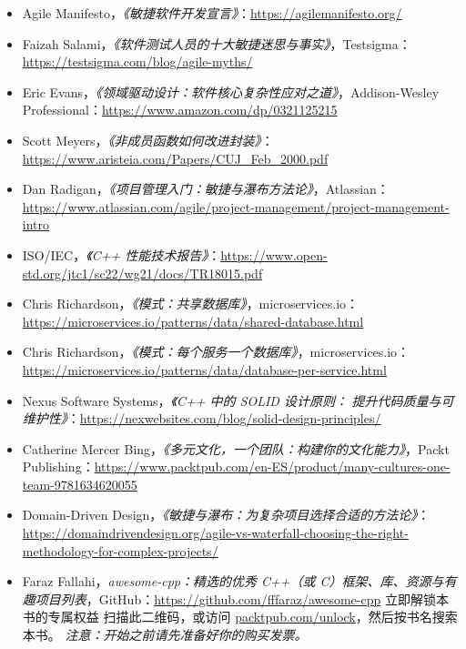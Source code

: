 \begin{itemize}
\item Agile Manifesto，\emph{《敏捷软件开发宣言》}：\href{https://agilemanifesto.org/}{https://agilemanifesto.org/}
\item Faizah Salami，\emph{《软件测试人员的十大敏捷迷思与事实》}，Testsigma：\href{https://testsigma.com/blog/agile-myths/}{https://testsigma.com/blog/agile-myths/}
\item Eric Evans，\emph{《领域驱动设计：软件核心复杂性应对之道》}，Addison-Wesley Professional：\href{https://www.amazon.com/dp/0321125215}{https://www.amazon.com/dp/0321125215}
\item Scott Meyers，\emph{《非成员函数如何改进封装》}：\href{https://www.aristeia.com/Papers/CUJ_Feb_2000.pdf}{https://www.aristeia.com/Papers/CUJ\_Feb\_2000.pdf}
\item Dan Radigan，\emph{《项目管理入门：敏捷与瀑布方法论》}，Atlassian：\href{https://www.atlassian.com/agile/project-management/project-management-intro}{https://www.atlassian.com/agile/project-management/project-management-intro}
\item ISO/IEC，\emph{《C++ 性能技术报告》}：\href{https://www.open-std.org/jtc1/sc22/wg21/docs/TR18015.pdf}{https://www.open-std.org/jtc1/sc22/wg21/docs/TR18015.pdf}
\item Chris Richardson，\emph{《模式：共享数据库》}，microservices.io：\href{https://microservices.io/patterns/data/shared-database.html}{https://microservices.io/patterns/data/shared-database.html}
\item Chris Richardson，\emph{《模式：每个服务一个数据库》}，microservices.io：\href{https://microservices.io/patterns/data/database-per-service.html}{https://microservices.io/patterns/data/database-per-service.html}
\item Nexus Software Systems，\emph{《C++ 中的 SOLID 设计原则：} \emph{提升代码质量与可维护性》}：\href{https://nexwebsites.com/blog/solid-design-principles/}{https://nexwebsites.com/blog/solid-design-principles/}
\item Catherine Mercer Bing，\emph{《多元文化，一个团队：构建你的文化能力》}，Packt Publishing：\href{https://www.packtpub.com/en-ES/product/many-cultures-one-team-9781634620055}{https://www.packtpub.com/en-ES/product/many-cultures-one-team-9781634620055}
\item Domain-Driven Design，\emph{《敏捷与瀑布：为复杂项目选择合适的方法论》}：\href{https://domaindrivendesign.org/agile-vs-waterfall-choosing-the-right-methodology-for-complex-projects/}{https://domaindrivendesign.org/agile-vs-waterfall-choosing-the-right-methodology-for-complex-projects/}
\item Faraz Fallahi，\emph{awesome-cpp：精选的优秀 C++（或 C）框架、库、资源与有趣项目列表}，GitHub：\href{https://github.com/fffaraz/awesome-cpp}{https://github.com/fffaraz/awesome-cpp} 立即解锁本书的专属权益 扫描此二维码，或访问 \href{http://packtpub.com/unlock}{packtpub.com/unlock}，然后按书名搜索本书。 \emph{注意：开始之前请先准备好你的购买发票。}
\end{itemize}
